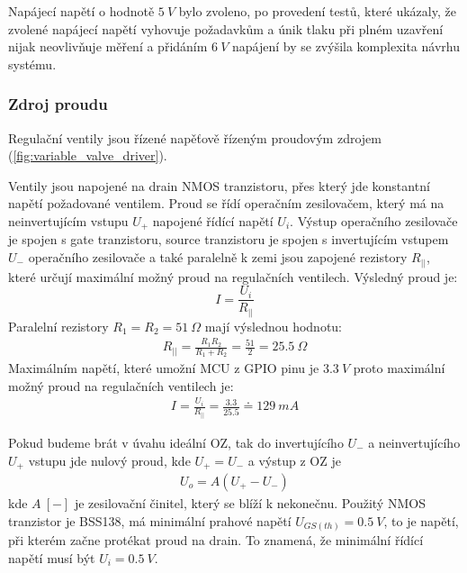 Napájecí napětí o hodnotě $5 \ V$ bylo zvoleno, po provedení testů, které ukázaly, že zvolené napájecí napětí vyhovuje požadavkům a únik tlaku při plném uzavření nijak neovlivňuje měření a přidáním $6 \ V$ napájení by se zvýšila komplexita návrhu systému.

\subsubsection{Zdroj proudu}
Regulační ventily jsou řízené napěťově řízeným proudovým zdrojem (\ref{fig:variable_valve_driver}).\par
Ventily jsou napojené na drain NMOS tranzistoru, přes který jde konstantní napětí požadované ventilem. Proud se řídí operačním zesilovačem, který má na neinvertujícím vstupu $U_+$ napojené řídící napětí $U_i$. Výstup operačního zesilovače je spojen s gate tranzistoru, source tranzistoru je spojen s invertujícím vstupem $U_-$ operačního zesilovače a také paralelně k zemi jsou zapojené rezistory $R_{||}$, které určují maximální možný proud na regulačních ventilech. Výsledný proud je:
\begin{equation}
    \label{eq:current_source}
    I = \frac{U_i}{R_{||}}
\end{equation}
Paralelní rezistory $R_1 = R_2 = 51 \ \Omega$ mají výslednou hodnotu:
\begin{align*}
    R_{||} = \frac{R_1 R_2}{R_1 + R_2} = \frac{51}{2} = 25.5 \ \Omega
\end{align*}
Maximálním napětí, které umožní MCU z GPIO pinu je $3.3 \ V$ proto maximální možný proud na regulačních ventilech je:
\begin{align*}
    I = \frac{U_i}{R_{||}} = \frac{3.3}{25.5} \doteq  129 \ mA
\end{align*}

Pokud budeme brát v úvahu ideální OZ, tak do invertujícího $U_-$ a neinvertujícího $U_+$ vstupu jde nulový proud, kde $U_+ = U_-$ a výstup z OZ je
\begin{align}
    U_o = A(U_+ - U_-)
\end{align}
kde $A \ [-] $ je zesilovační činitel, který se blíží k nekonečnu.
Použitý NMOS tranzistor je BSS138, má minimální prahové napětí $U_{GS(th)} = 0.5 \ V$, to je napětí, při kterém začne protékat proud na drain.
To znamená, že minimální řídící napětí musí být $U_{i} = 0.5 \ V$.



